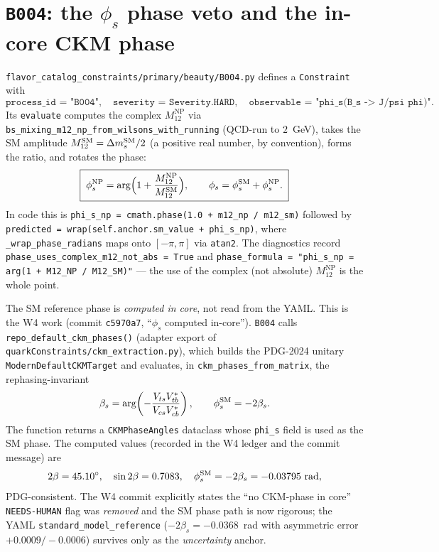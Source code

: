 \documentclass[11pt]{article}
\newcommand{\code}[1]{\texttt{#1}}
\newcommand{\dms}{\Delta m_s}
\newcommand{\phis}{\phi_s}
\newcommand{\MtwelveNP}{M_{12}^{\mathrm{NP}}}
\newcommand{\MtwelveSM}{M_{12}^{\mathrm{SM}}}
\newcommand{\betas}{\beta_s}
\theoremstyle{definition}
\begin{document}
\section{\code{B004}: the $\phis$ phase veto and the in-core CKM phase}
\label{sec:codeB004}
\label{sec:incore}

\code{flavor\_catalog\_constraints/primary/beauty/B004.py} defines a
\code{Constraint} with
\begin{equation}
\code{process\_id = "B004"},\quad
\code{severity = Severity.HARD},\quad
\code{observable = "phi\_s(B\_s -> J/psi phi)"}.
\end{equation}
Its \code{evaluate} computes the complex $\MtwelveNP$ via
\code{bs\_mixing\_m12\_np\_from\_wilsons\_with\_running} (QCD-run to $2$~GeV),
takes the SM amplitude $\MtwelveSM = \dms^{\rm SM}/2$ (a positive real number, by
convention), forms the ratio, and rotates the phase:
\begin{equation}
\boxed{\;
\phis^{\rm NP} = \arg\!\Big(1 + \frac{\MtwelveNP}{\MtwelveSM}\Big),
\qquad
\phis = \phis^{\rm SM} + \phis^{\rm NP}.
\;}
\label{eq:codephis}
\end{equation}
In code this is \code{phi\_s\_np = cmath.phase(1.0 + m12\_np / m12\_sm)} followed
by \code{predicted = wrap(self.anchor.sm\_value + phi\_s\_np)}, where
\code{\_wrap\_phase\_radians} maps onto $[-\pi,\pi]$ via \code{atan2}. The
diagnostics record \code{phase\_uses\_complex\_m12\_not\_abs = True} and
\code{phase\_formula = "phi\_s\_np = arg(1 + M12\_NP / M12\_SM)"} --- the use of
the complex (not absolute) $\MtwelveNP$ is the whole point.

The SM reference phase is \emph{computed in core}, not read from the YAML. This is
the W4 work (commit \code{c5970a7}, ``$\phis$ computed in-core''). \code{B004}
calls \code{repo\_default\_ckm\_phases()} (adapter export of
\code{quarkConstraints/ckm\_extraction.py}), which builds the PDG-2024 unitary
\code{ModernDefaultCKMTarget} and evaluates, in
\code{ckm\_phases\_from\_matrix}, the rephasing-invariant
\begin{equation}
\betas = \arg\!\left(-\frac{V_{ts}V_{tb}^*}{V_{cs}V_{cb}^*}\right),
\qquad
\phis^{\rm SM} = -2\betas .
\label{eq:codebetas}
\end{equation}
The function returns a \code{CKMPhaseAngles} dataclass whose \code{phi\_s} field
is used as the SM phase. The computed values (recorded in the W4 ledger and the
commit message) are
\begin{equation}
2\beta = 45.10^\circ,\quad \sin 2\beta = 0.7083,\quad
\phis^{\rm SM} = -2\betas = -0.03795\ \text{rad},
\end{equation}
PDG-consistent. The W4 commit explicitly states the ``no CKM-phase in core''
\code{NEEDS-HUMAN} flag was \emph{removed} and the SM phase path is now
rigorous; the YAML \code{standard\_model\_reference} ($-2\betas = -0.0368$~rad
with asymmetric error $+0.0009/-0.0006$) survives only as the \emph{uncertainty}
anchor.
\end{document}
